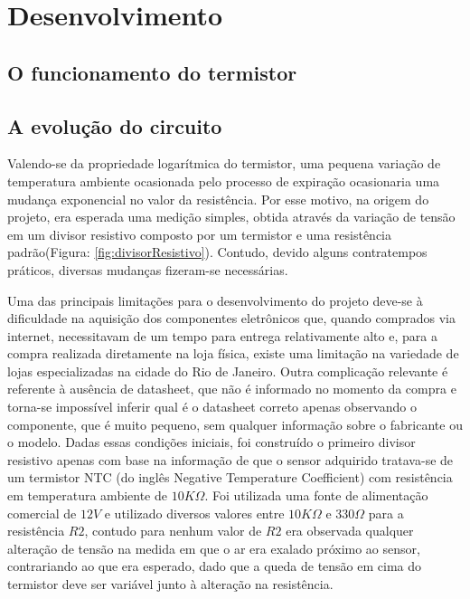 \chapter{Desenvolvimento}
  
\section{O funcionamento do termistor}

\section{A evolução do circuito}
 
Valendo-se da propriedade logarítmica do termistor, uma pequena variação de temperatura ambiente ocasionada pelo processo de expiração ocasionaria uma mudança exponencial no valor da resistência. Por esse motivo, na origem do projeto, era esperada uma medição simples, obtida através da variação de tensão em um divisor resistivo composto por um termistor e uma resistência padrão(Figura: \ref{fig:divisorResistivo}). Contudo, devido alguns contratempos práticos, diversas mudanças fizeram-se necessárias. 
 

 
Uma das principais limitações para o desenvolvimento do projeto deve-se à dificuldade na aquisição dos componentes eletrônicos que, quando comprados via internet, necessitavam de um tempo para entrega relativamente alto e, para a compra realizada diretamente na loja física, existe uma limitação na variedade de lojas especializadas na cidade do Rio de Janeiro. Outra complicação relevante é referente à ausência de datasheet, que não é informado no momento da compra e torna-se impossível inferir qual é o datasheet correto apenas observando o componente, que é muito pequeno, sem qualquer informação sobre o fabricante ou o modelo. Dadas essas condições iniciais, foi construído o primeiro divisor resistivo apenas com base na informação de que o sensor adquirido tratava-se de um termistor NTC (do inglês Negative Temperature Coefficient) com resistência em temperatura ambiente de $10K\Omega$. Foi utilizada uma fonte de alimentação comercial de $12V$ e utilizado diversos valores entre $10K\Omega$ e $330\Omega$ para a resistência $R2$, contudo para nenhum valor de $R2$ era observada qualquer alteração de tensão na medida em que o ar era exalado próximo ao sensor, contrariando ao que era esperado, dado que a queda de tensão em cima do termistor deve ser variável junto à alteração na resistência.
 
